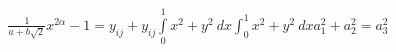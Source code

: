 \documentclass[preview]{standalone}
\begin{document}
\begin{align*}
\frac{1}{a+b\sqrt{2}} x^{2 \alpha} - 1 = y_{ij} + y_{ij} \int\limits_0^1 x^2 + y^2 \ dx \int_0^1 x^2 + y^2 \ dx   a_1^2 + a_2^2 = a_3^2
\end{align*}
\end{document}

